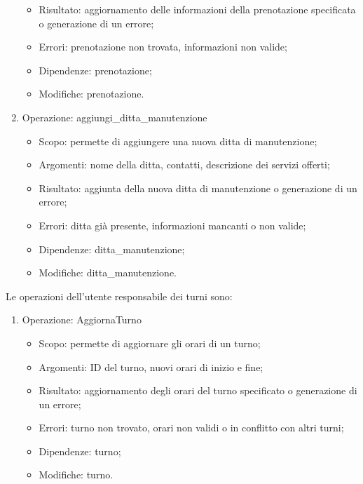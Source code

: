 \documentclass{article}
\begin{document}
\begin{flushleft}
\begin{enumerate}
\begin{itemize}
                \item Risultato: aggiornamento delle informazioni della prenotazione specificata o generazione di un errore;
                \item Errori: prenotazione non trovata, informazioni non valide;
                \item Dipendenze: prenotazione;
                \item Modifiche: prenotazione.
            \end{itemize}
            \item Operazione: aggiungi\_ditta\_manutenzione \\
            \begin{itemize}
                \item Scopo: permette di aggiungere una nuova ditta di manutenzione;
                \item Argomenti: nome della ditta, contatti, descrizione dei servizi offerti;
                \item Risultato: aggiunta della nuova ditta di manutenzione o generazione di un errore;
                \item Errori: ditta già presente, informazioni mancanti o non valide;
                \item Dipendenze: ditta\_manutenzione;
                \item Modifiche: ditta\_manutenzione.
            \end{itemize}
        \end{enumerate}
        Le operazioni dell'utente responsabile dei turni sono:
        \begin{enumerate}
            \item Operazione: AggiornaTurno \\
            \begin{itemize}
                \item Scopo: permette di aggiornare gli orari di un turno;
                \item Argomenti: ID del turno, nuovi orari di inizio e fine;
                \item Risultato: aggiornamento degli orari del turno specificato o generazione di un errore;
                \item Errori: turno non trovato, orari non validi o in conflitto con altri turni;
                \item Dipendenze: turno;
                \item Modifiche: turno.
            \end{itemize}

\end{enumerate}
\end{flushleft}
\end{document}
